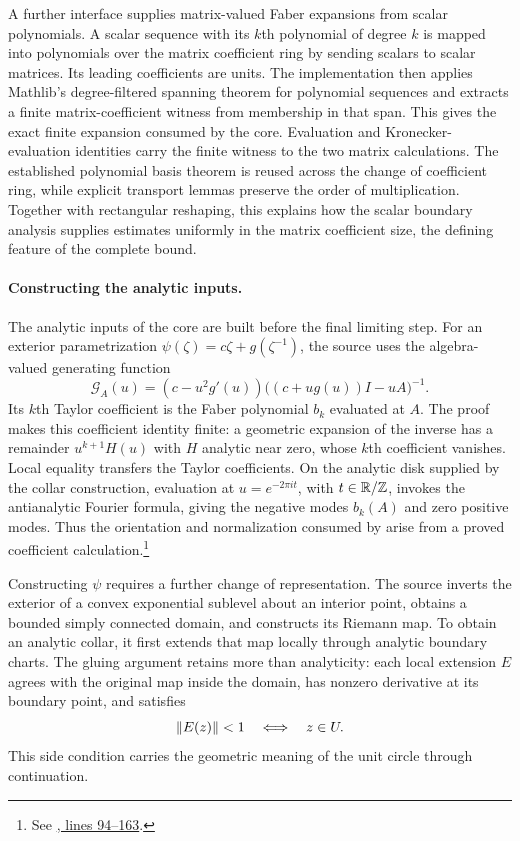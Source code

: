 A further interface supplies matrix-valued Faber expansions from scalar
polynomials. A scalar sequence with its $k$th polynomial of degree $k$ is
mapped into polynomials over the matrix coefficient ring by sending scalars
to scalar matrices. Its leading coefficients are units. The implementation
then applies Mathlib's degree-filtered spanning theorem for polynomial
sequences and extracts a finite matrix-coefficient witness from membership
in that span. This gives the exact finite expansion consumed by the core.
Evaluation and Kronecker-evaluation identities carry the finite witness to the two matrix calculations. The established polynomial basis theorem is
reused across the change of coefficient ring, while explicit transport lemmas
preserve the order of multiplication. Together with rectangular reshaping,
this explains how the scalar boundary analysis supplies estimates uniformly
in the matrix coefficient size, the defining feature of the complete bound.

\paragraph{Constructing the analytic inputs.}
The analytic inputs of the core are built before the final limiting step.
For an exterior parametrization $\psi(\zeta)=c\zeta+g(\zeta^{-1})$, the
source uses the algebra-valued generating function
\[
 \mathcal G_A(u)=
 (c-u^2g'(u))\bigl((c+ug(u))I-uA\bigr)^{-1}.
\]
Its $k$th Taylor coefficient is the Faber polynomial $b_k$ evaluated at
$A$. The proof makes this coefficient identity finite: a geometric
expansion of the inverse has a remainder $u^{k+1}H(u)$ with $H$ analytic
near zero, whose $k$th coefficient vanishes. Local equality transfers the Taylor coefficients. On the analytic disk supplied by the collar construction, evaluation at $u=e^{-2\pi it}$, with $t\in\mathbb R/\mathbb{Z}$, invokes the antianalytic Fourier formula, giving
the negative modes $b_k(A)$ and zero positive modes. Thus the orientation
and normalization consumed by  arise from a
proved coefficient calculation.\footnote{See
\href{https://github.com/openai/math/blob/fd4aeeb2ee4fc729c18d98444fed42fd0529eeeb/lean/OAI/Analysis/DirectCrouzeix/FaberCalculus.lean\#L94-L163}{, lines 94--163}.}

Constructing $\psi$ requires a further change of representation. The source
inverts the exterior of a convex exponential sublevel about an interior
point, obtains a bounded simply connected domain, and constructs its
Riemann map. To obtain an analytic collar, it first extends that map
locally through analytic boundary charts. The gluing argument retains
more than analyticity: each local extension $E$ agrees with the original
map inside the domain, has nonzero derivative at its boundary point, and
satisfies
\[
 \lVert E(z)\rVert<1\quad\Longleftrightarrow\quad z\in U.
\]
This side condition carries the geometric meaning of the unit circle
through continuation.

